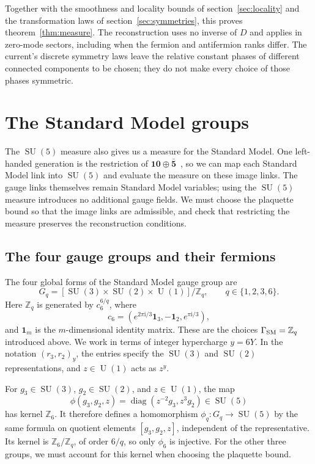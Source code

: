 \documentclass[11pt,a4paper]{article}
\theoremstyle{remark}
\DeclareMathOperator{\SU}{SU}
\DeclareMathOperator{\U}{U}
\newcommand{\Id}{\mathbf 1}
\newcommand{\ii}{\mathrm i}
\begin{document}
Together with the smoothness and locality bounds of
section~\ref{sec:locality} and the transformation laws of
section~\ref{sec:symmetries}, this proves theorem~\ref{thm:measure}.
The reconstruction uses no inverse of $D$ and applies in zero-mode
sectors, including when the fermion and antifermion ranks differ.
The current's discrete symmetry laws leave the relative constant phases
of different connected components to be chosen; they do not make every
choice of those phases symmetric.

\section{The Standard Model groups}
\label{sec:standard-model}

The $\SU(5)$ measure also gives us a measure for the Standard Model.
One left-handed generation is the restriction of
$\mathbf{10}\oplus\bar{\mathbf5}$~\cite{GeorgiGlashow}, so we can map
each Standard Model link into $\SU(5)$ and evaluate the measure on
these image links. The gauge links themselves remain Standard Model
variables; using the $\SU(5)$ measure introduces no additional gauge
fields. We must choose the plaquette bound so that the image links are
admissible, and check that restricting the measure preserves the
reconstruction conditions.

\subsection{The four gauge groups and their fermions}

The four global forms of the Standard Model gauge group are~\cite{HucksGlobal,TongGlobal}
\begin{equation}
 G_q=[\SU(3)\times\SU(2)\times\U(1)]/\mathbb Z_q,
 \qquad q\in\{1,2,3,6\}.
 \label{eq:sm-groups}
\end{equation}
Here $\mathbb Z_q$ is generated by $c_6^{6/q}$, where
\begin{equation}
 c_6=(e^{2\pi\ii/3}\Id_3,-\Id_2,e^{\pi\ii/3}),
\end{equation}
and $\Id_m$ is the $m$-dimensional identity matrix. These are the
choices $\Gamma_{\rm SM}=\mathbb Z_q$ introduced above. We work in
terms of integer hypercharge $y=6Y$. In the notation $(r_3,r_2)_y$,
the entries specify the $\SU(3)$ and $\SU(2)$ representations, and
$z\in\U(1)$ acts as $z^y$.

For $g_3\in\SU(3)$, $g_2\in\SU(2)$, and $z\in\U(1)$, the map
\begin{equation}
 \phi(g_3,g_2,z)=\operatorname{diag}(z^{-2}g_3,z^3g_2)\in\SU(5)
 \label{eq:sm-map}
\end{equation}
has kernel $\mathbb Z_6$. It therefore defines a homomorphism
$\phi_q:G_q\to\SU(5)$ by the same formula on quotient elements
$[g_3,g_2,z]$, independent of the representative. Its kernel is
$\mathbb Z_6/\mathbb Z_q$, of order $6/q$, so only $\phi_6$ is
injective. For the other three groups, we must account for this kernel
when choosing the plaquette bound.
\end{document}
